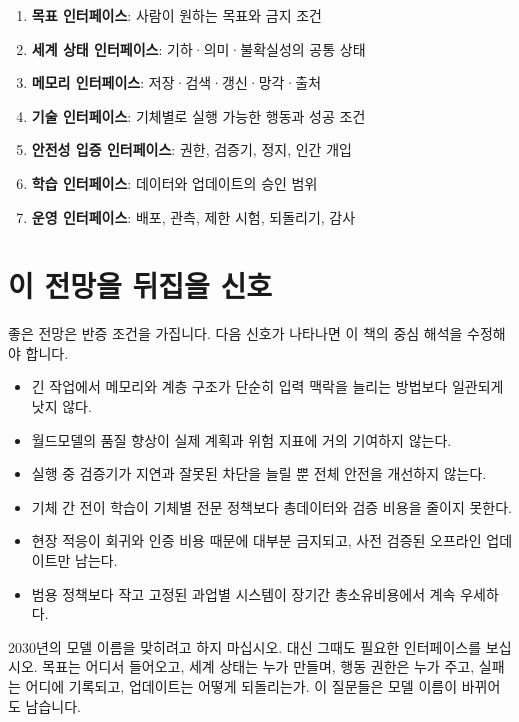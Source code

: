 \documentclass[11pt,openany]{book}
\begin{document}
\begin{boardbox}
\begin{enumerate}
  \item \textbf{목표 인터페이스}: 사람이 원하는 목표와 금지 조건
  \item \textbf{세계 상태 인터페이스}: 기하·의미·불확실성의 공통 상태
  \item \textbf{메모리 인터페이스}: 저장·검색·갱신·망각·출처
  \item \textbf{기술 인터페이스}: 기체별로 실행 가능한 행동과 성공 조건
  \item \textbf{안전성 입증 인터페이스}: 권한, 검증기, 정지, 인간 개입
  \item \textbf{학습 인터페이스}: 데이터와 업데이트의 승인 범위
  \item \textbf{운영 인터페이스}: 배포, 관측, 제한 시험, 되돌리기, 감사
\end{enumerate}
\end{boardbox}

\section{이 전망을 뒤집을 신호}

좋은 전망은 반증 조건을 가집니다. 다음 신호가 나타나면 이 책의 중심 해석을 수정해야 합니다.

\begin{itemize}
  \item 긴 작업에서 메모리와 계층 구조가 단순히 입력 맥락을 늘리는 방법보다 일관되게 낫지 않다.
  \item 월드모델의 품질 향상이 실제 계획과 위험 지표에 거의 기여하지 않는다.
  \item 실행 중 검증기가 지연과 잘못된 차단을 늘릴 뿐 전체 안전을 개선하지 않는다.
  \item 기체 간 전이 학습이 기체별 전문 정책보다 총데이터와 검증 비용을 줄이지 못한다.
  \item 현장 적응이 회귀와 인증 비용 때문에 대부분 금지되고, 사전 검증된 오프라인 업데이트만 남는다.
  \item 범용 정책보다 작고 고정된 과업별 시스템이 장기간 총소유비용에서 계속 우세하다.
\end{itemize}

\begin{profbox}
2030년의 모델 이름을 맞히려고 하지 마십시오. 대신 그때도 필요한 인터페이스를 보십시오. 목표는 어디서 들어오고, 세계 상태는 누가 만들며, 행동 권한은 누가 주고, 실패는 어디에 기록되고, 업데이트는 어떻게 되돌리는가. 이 질문들은 모델 이름이 바뀌어도 남습니다.
\end{profbox}
\end{document}
